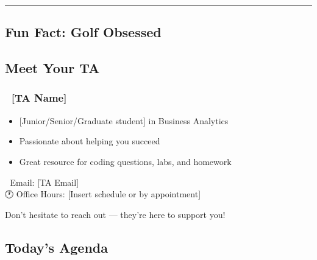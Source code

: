 \documentclass[
  letterpaper,
  DIV=11,
  numbers=noendperiod]{scrartcl}
\providecommand{\tightlist}{%
  \setlength{\itemsep}{0pt}\setlength{\parskip}{0pt}}
\begin{document}
\begin{center}\rule{0.5\linewidth}{0.5pt}\end{center}

\subsection{Fun Fact: Golf Obsessed}\label{fun-fact-golf-obsessed}

\subsection{Meet Your TA}\label{meet-your-ta}

\subsubsection{👋 {[}TA Name{]}}\label{ta-name}

\begin{itemize}
\tightlist
\item
  {[}Junior/Senior/Graduate student{]} in Business Analytics\\
\item
  Passionate about helping you succeed\\
\item
  Great resource for coding questions, labs, and homework
\end{itemize}

📧 Email: {[}TA Email{]}\\
🕐 Office Hours: {[}Insert schedule or by appointment{]}

\begin{tcolorbox}[enhanced jigsaw, colbacktitle=quarto-callout-important-color!10!white, opacityback=0, colback=white, opacitybacktitle=0.6, toptitle=1mm, left=2mm, bottomrule=.15mm, breakable, bottomtitle=1mm, rightrule=.15mm, titlerule=0mm, title=\textcolor{quarto-callout-important-color}{\faExclamation}\hspace{0.5em}{Important}, coltitle=black, colframe=quarto-callout-important-color-frame, arc=.35mm, toprule=.15mm, leftrule=.75mm]

Don't hesitate to reach out --- they're here to support you!

\end{tcolorbox}

\subsection{Today's Agenda}\label{todays-agenda}
\end{document}
